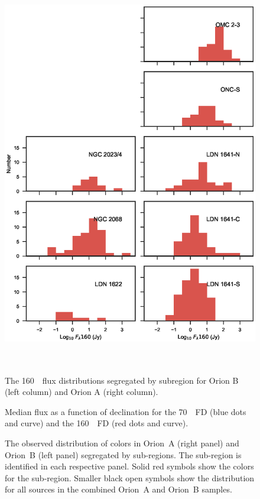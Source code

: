 \documentclass[manuscript]{aastex61}
\begin{document}
\begin{figure}[ht]
\centering
\includegraphics[height=7in]{figures/LF160_byregion.eps}
\caption{The 160~\micron\ flux distributions segregated by subregion for Orion B (left column) and Orion A (right column).\label{fig:fd160regional}}
\end{figure}

\clearpage

\begin{figure}[ht]
\centering
{}
\caption{Median flux as a function of declination for the 70~\micron\ FD (blue dots and curve) and the 160~\micron\ FD (red dots and curve).\label{fig:mdFlux_v_dec}}
\end{figure}

\clearpage

\begin{figure}[ht]
\centering
{}
\caption{The observed distribution of colors in Orion~A (right panel) and Orion~B (left panel) segregated by sub-regions.  The sub-region is identified in each respective panel.  Solid red symbols show the colors for the sub-region.  Smaller black open symbols show the distribution for all sources in the combined Orion~A and Orion~B samples. \label{fig:clrclr}}
\end{figure}
\end{document}
